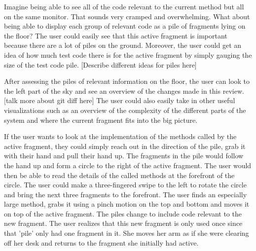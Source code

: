 \documentclass{acm_proc_article-sp}
\begin{document}
 Imagine being able to see all of the code relevant to the current method but all on the same monitor. That sounds very cramped and overwhelming. What about being able to display each group of relevant code as a pile of fragments lying on the floor? The user could easily see that this active fragment is important because there are a lot of piles on the ground. Moreover, the user could get an idea of how much test code there is for the active fragment by simply gauging the size of the test code pile. [Describe different ideas for piles here]
 
 After assessing the piles of relevant information on the floor, the user can look to the left part of the sky and see an overview of the changes made in this review. [talk more about git diff here]
 The user could also easily take in other useful visualizations such as an overview of the complexity of the different parts of the system and where the current fragment fits into the big picture.
    
    
 If the user wants to look at the implementation of the methods called by the active fragment, they could simply reach out in the direction of the pile, grab it with their hand and pull their hand up. The fragments in the pile would follow the hand up and form a circle to the right of the active fragment. The user would then be able to read the details of the called methods at the forefront of the circle. The user could make a three-fingered swipe to the left to rotate the circle and bring the next three fragments to the forefront.  The user finds an especially large method, grabs it using a pinch motion on the top and bottom and moves it on top of the active fragment. The piles change to include code relevant to the new fragment.  The user realizes that this new fragment is only used once since that 'pile' only had one  fragment in it. She moves her arm as if she were clearing off her desk and returns to the fragment she initially had active.
    
    

\end{document}
